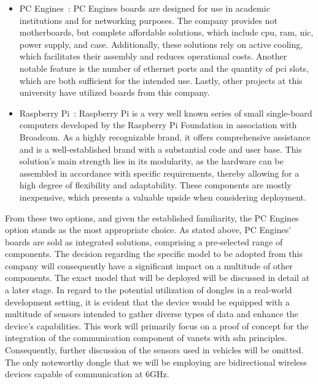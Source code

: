\begin{itemize}
    \item PC Engines~\cite{noauthor_pc_nodate}: 
    PC Engines boards are designed for use in academic institutions and for networking purposes. The company provides not motherboards, but complete affordable solutions, which include \gls{cpu}, \gls{ram}, \gls{nic}, power supply, and case. Additionally, these solutions rely on active cooling, which facilitates their assembly and reduces operational costs. Another notable feature is the number of ethernet ports and the quantity of \gls{pci} slots, which are both sufficient for the intended use. Lastly, other projects at this university have utilized boards from this company.
    \item Raspberry Pi~\cite{ltd_buy_nodate}: 
    Raspberry Pi is a very well known series of small single-board computers developed by the Raspberry Pi Foundation in association with Broadcom. As a highly recognizable brand, it offers comprehensive assistance and is a well-established brand with a substantial code and user base. This solution's main strength lies in its modularity, as the hardware can be assembled in accordance with specific requirements, thereby allowing for a high degree of flexibility and adaptability. These components are mostly inexpensive, which presents a valuable upside when considering deployment.
\end{itemize}
From these two options, and given the established familiarity, the PC Engines option stands as the most appropriate choice. As stated above, PC Engines' boards are sold as integrated solutions, comprising a pre-selected range of components. The decision regarding the specific model to be adopted from this company will consequently have a significant impact on a multitude of other components. The exact model that will be deployed will be discussed in detail at a later stage. 
In regard to the potential utilization of dongles in a real-world development setting, it is evident that the device would be equipped with a multitude of sensors intended to gather diverse types of data and enhance the device's capabilities. This work will primarily focus on a proof of concept for the integration of the communication component of \glspl{vanet} with \gls{sdn} principles. Consequently, further discussion of the sensors used in vehicles will be omitted. The only noteworthy dongle that we will be employing are bidirectional wireless devices capable of communication at 6GHz.


